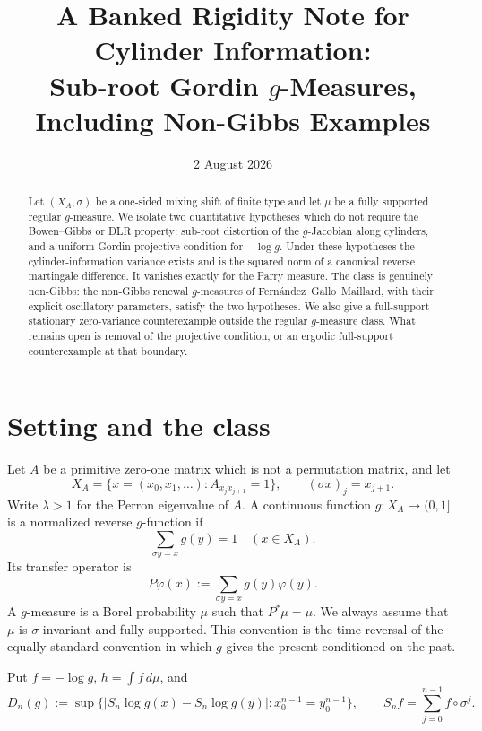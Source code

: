 \documentclass[11pt]{article}
\title{A Banked Rigidity Note for Cylinder Information:\\
Sub-root Gordin $g$-Measures, Including Non-Gibbs Examples}
\author{}
\date{2 August 2026}
\theoremstyle{definition}
\theoremstyle{remark}
\begin{document}
\maketitle

\begin{abstract}
Let $(X_A,\sigma)$ be a one-sided mixing shift of finite type and let
$\mu$ be a fully supported regular $g$-measure.  We isolate two
quantitative hypotheses which do not require the Bowen--Gibbs or DLR
property: sub-root distortion of the $g$-Jacobian along cylinders, and a
uniform Gordin projective condition for $-\log g$.  Under these hypotheses
the cylinder-information variance exists and is the squared norm of a
canonical reverse martingale difference.  It vanishes exactly for the
Parry measure.  The class is genuinely non-Gibbs: the non-Gibbs renewal
$g$-measures of Fern\'andez--Gallo--Maillard, with their explicit oscillatory
parameters, satisfy the two hypotheses.  We also give a full-support
stationary zero-variance counterexample outside the regular $g$-measure
class.  What remains open is removal of the projective condition, or an
ergodic full-support counterexample at that boundary.
\end{abstract}

\section{Setting and the class}

Let $A$ be a primitive zero-one matrix which is not a permutation matrix,
and let
\[
 X_A=\{x=(x_0,x_1,\ldots):A_{x_jx_{j+1}}=1\},\qquad
 (\sigma x)_j=x_{j+1}.
\]
Write $\lambda>1$ for the Perron eigenvalue of $A$.  A continuous function
$g:X_A\to(0,1]$ is a normalized reverse $g$-function if
\begin{equation}\label{eq:normalization}
 \sum_{\sigma y=x}g(y)=1\quad(x\in X_A).
\end{equation}
Its transfer operator is
\[
 P\varphi(x):=\sum_{\sigma y=x}g(y)\varphi(y).
\]
A $g$-measure is a Borel probability $\mu$ such that $P^*\mu=\mu$.
We always assume that $\mu$ is $\sigma$-invariant and fully supported.
This convention is the time reversal of the equally standard convention
in which $g$ gives the present conditioned on the past.

Put $f=-\log g$, $h=\int f\,d\mu$, and
\[
 D_n(g):=\sup\{|S_n\log g(x)-S_n\log g(y)|:
                 x_0^{n-1}=y_0^{n-1}\},
 \qquad S_nf=\sum_{j=0}^{n-1}f\circ\sigma^j.
\]
\end{document}
